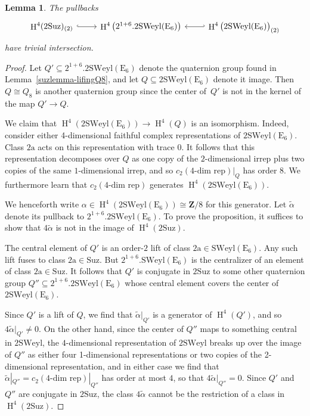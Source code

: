 \documentclass[pdftex]{sigma}
\numberwithin{equation}{section}
\newtheorem{Lemma}[Theorem]{Lemma}
\newcommand\bZ{\mathbf Z}
\newcommand\ra{\mathrm a}
\newcommand\rE{\mathrm E}
\DeclareMathOperator\homology{H}
\renewcommand\H{\homology}
\newcommand\<\langle
\renewcommand\>\rangle
\newcommand\Suz{\mathrm{Suz}}
\newcommand\SWeyl{\mathrm{SWeyl}}
\begin{document}
\begin{Lemma} \label{suz trivial intersection} The pullbacks \[
 \begin{tikzcd}
 \H^4(2\Suz)_{(2)} \arrow[r,hook] &
 \H^4\big(2^{1+6}.2\SWeyl (\rE_6)\big)
 & \H^4\big(2\SWeyl (\rE_6)\big)_{(2)} \arrow[l,hook']
 \end{tikzcd}
 \] have trivial intersection.
\end{Lemma}

\begin{proof} Let $Q' \subseteq 2^{1+6}.2\SWeyl (\rE_6)$ denote the quaternion group found in Lemma~\ref{suzlemma-lifingQ8}, and let $Q \subseteq 2\SWeyl(\rE_6)$ denote it image. Then $Q \cong Q_8$ is another quaternion group since the center of~$Q'$ is not in the kernel of the map $Q' \to Q$.

 We claim that $\H^4(2\SWeyl(\rE_6)) \to \H^4(Q)$ is an isomorphism. Indeed, consider either 4-dimensional faithful complex representations of $2\SWeyl(\rE_6)$. Class $2\ra$ acts on this representation with trace $0$. It follows that this representation decomposes over $Q$ as one copy of the $2$-dimensional irrep plus two copies of the same $1$-dimensional irrep, and so $c_2(\text{4-dim rep})|_Q$ has order $8$. We furthermore learn that $c_2(\text{4-dim rep})$ generates $\H^4(2\SWeyl(\rE_6))$.

 We henceforth write $\alpha \in \H^4(2\SWeyl (\rE_6)) \cong \bZ/8$ for this generator. Let $\tilde\alpha$ denote its pullback to $2^{1+6}.2\SWeyl (\rE_6)$.
 To prove the proposition, it suffices to show that $4\tilde\alpha$ is not in the image of $\H^4(2\Suz)$.

The central element of $Q'$ is an order-$2$ lift of class $2\ra \in \SWeyl(\rE_6)$. Any such lift fuses to class $2\ra \in \Suz$. But $2^{1+6}.\SWeyl(\rE_6)$ is the centralizer of an element of class $2\ra \in \Suz$. It follows that $Q'$ is conjugate in $2\Suz$ to some other quaternion group $Q'' \subseteq 2^{1+6}.2\SWeyl(\rE_6)$ whose central element
covers the center of $2\SWeyl(\rE_6)$.

Since $Q'$ is a lift of $Q$, we find that $\tilde\alpha|_{Q'}$ is a generator of $\H^4(Q')$, and so $4\tilde\alpha|_{Q'} \neq 0$.
On the other hand, since the center of $Q''$ maps to something central in $2\SWeyl$, the $4$-dimensional representation of $2\SWeyl$ breaks up over the image of $Q''$ as either four 1-dimensional representations or two copies of the 2-dimensional representation, and in either case we find that $\tilde\alpha|_{Q''} = c_2(\text{4-dim rep})|_{Q''}$ has order at most $4$, so that $4\tilde\alpha|_{Q''} = 0$. Since $Q'$ and $Q''$ are conjugate in $2\Suz$, the class $4\tilde\alpha$ cannot be the restriction of a class in $\H^4(2\Suz)$.
\end{proof}
\end{document}
